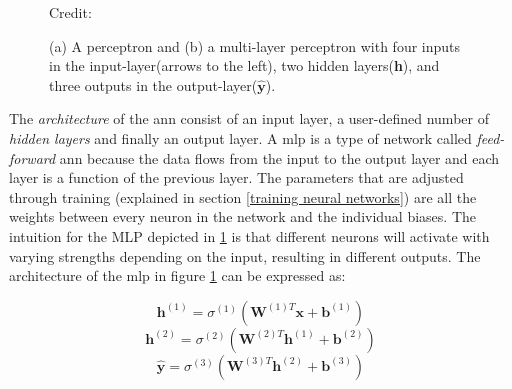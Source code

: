             \begin{figure}[H]
                \centering
                
                \caption[The perceptron and multi-layer perceptron]{(a) A perceptron and (b) a multi-layer perceptron with four inputs in the input-layer(arrows to the left), two hidden layers(\textbf{h}), and three outputs in the output-layer($\hat{\textbf{y}}$).}
              	\medskip 
                \hspace*{15pt}\hbox{\scriptsize Credit: \citeauthor{razavi2021deep_exp_DL}\cite{razavi2021deep_exp_DL}}
                \label{Perceptron / MLP}
            \end{figure}
        
        The \textit{architecture} of the \gls{ann} consist of an input layer, a user-defined number of \textit{hidden layers} and finally an output layer\cite{razavi2021deep_exp_per}. A \gls{mlp} is a type of network called \textit{feed-forward} \gls{ann} because the data flows from the input to the output layer and each layer is a function of the previous layer. The parameters that are adjusted through training (explained in section \ref{training neural networks}) are all the weights between every neuron in the network and the individual biases. The intuition for the MLP depicted in \ref{Perceptron / MLP} is that different neurons will activate with varying strengths depending on the input, resulting in different outputs. The architecture of the \gls{mlp} in figure \ref{Perceptron / MLP} can be expressed as\cite{Goodfellow-et-al-2016_architecture}:
        
        \begin{equation}
            \textbf{h}^{(1)} = \sigma^{(1)}(\textbf{W}^{(1)T}\textbf{x} + \textbf{b}^{(1)})
        \end{equation}
        \begin{equation}
            \textbf{h}^{(2)} = \sigma^{(2)}(\textbf{W}^{(2)T}\textbf{h}^{(1)} + \textbf{b}^{(2)})
        \end{equation}
        \begin{equation} \label{mlp outputlayer eq}
            \hat{\textbf{y}} = \sigma^{(3)}(\textbf{W}^{(3)T}\textbf{h}^{(2)} + \textbf{b}^{(3)})
        \end{equation}
        
        
